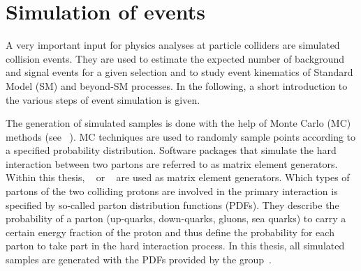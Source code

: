 


\FloatBarrier
\chapter{Simulation of events}
\label{ch:SimulationOfEvents}
A very important input for physics analyses at particle colliders are simulated collision events.
They are used to estimate the expected number of background and signal events for a given selection and to study event kinematics of Standard Model (SM) and beyond-SM processes.
In the following, a short introduction to the various steps of event simulation is given.

The generation of simulated samples is done with the help of Monte Carlo (MC) methods (see \eg~\cite{bib:MC_Introduction}).
MC techniques are used to randomly sample points according to a specified probability distribution.
Software packages that simulate the hard interaction between two partons are referred to as matrix element generators.
Within this thesis, \madgraph~\cite{bib:Madgraph_2014} or \pythiaSix~\cite{bib:Pyhtia6_2006} are used as matrix element generators.
Which types of partons of the two colliding protons are involved in the primary interaction is specified by so-called parton distribution functions (PDFs).
They describe the probability of a parton (up-quarks, down-quarks, gluons, sea quarks) to carry a certain energy fraction of the proton and thus define the probability for each parton to take part in the hard interaction process.
In this thesis, all simulated samples are generated with the PDFs provided by the \cteq group~\cite{Pumplin:2002vw}.

